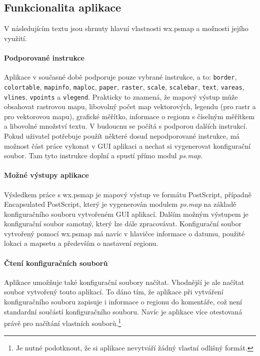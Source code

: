 \documentclass[a4paper,12pt,draft]{article}
\newcommand{\modul}[1]{\emph{#1}}
\newcommand{\instr}[1]{\lstinline[style=psmapInline]|#1|}
\begin{document}
\subsection{Funkcionalita aplikace}
V následujícím textu jsou shrnuty hlavní vlastnosti wx.psmap a možnosti
jejího využití.

\paragraph*{Podporované instrukce}
Aplikace v současné době podporuje pouze vybrané instrukce, a to:
\instr{border}, \instr{colortable}, \instr{mapinfo}, \instr{maploc},
\instr{paper}, \instr{raster}, \instr{scale}, \instr{scalebar},
\instr{text}, \instr{vareas}, \instr{vlines}, \instr{vpoints} a
\instr{vlegend}. Prakticky to znamená, že mapový výstup může
obsahovat rastrovou mapu, libovolný počet map vektorových, legendu (pro
rastr a pro vektorovou mapu), grafické měřítko, informace o regionu
s číselným měřítkem a libovolné množství textu. V budoucnu se
počítá s podporou dalších instrukcí. Pokud uživatel potřebuje
použít některé dosud nepodporované instrukce, má možnost část
práce vykonat v GUI aplikaci a nechat si vygenerovat konfigurační
soubor. Tam tyto instrukce doplní a spustí přímo modul \modul{ps.map}.

\paragraph*{Možné výstupy aplikace}
Výsledkem práce s wx.psmap je mapový výstup ve formátu PostScript,
případně Encapsulated PostScript, který je vygenerován modulem
\modul{ps.map} na základě konfiguračního souboru vytvořeném GUI
aplikací. Dalším možným výstupem je konfigurační soubor samotný,
který lze dále zpracovávat. Konfigurační soubor vytvořený pomocí
wx.psmap má navíc v hlavičce informace o datumu, použité lokaci a
mapsetu a především o nastavení regionu.

\paragraph*{Čtení konfiguračních souborů}
Aplikace umožňuje také konfigurační soubory načítat. Vhodnější
je ale načítat soubor vytvořený touto aplikací. To dáno tím, že
aplikace při vytváření konfiguračního souboru zapisuje i informace o
regionu do komentáře, což není standardní součástí konfiguračního
souboru. Navíc je aplikace více otestovaná právě pro načítání
vlastních souborů.\footnote{Je nutné podotknout, že si aplikace nevytváří
žádný vlastní odlišný formát.}
\end{document}
